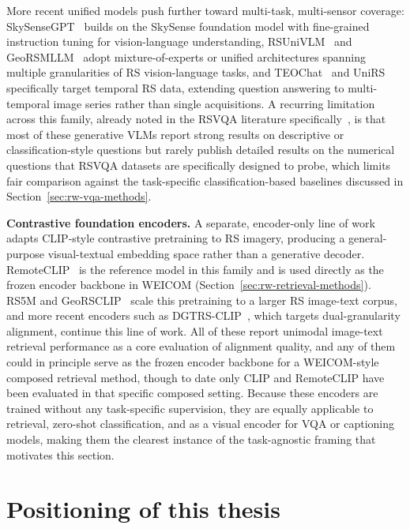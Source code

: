 More recent unified models push further toward multi-task, multi-sensor coverage: SkySenseGPT~\cite{luo2024skysensegptfinegrainedinstructiontuning} builds on the SkySense foundation model with fine-grained instruction tuning for vision-language understanding, RSUniVLM~\cite{liu2024rsunivlmunifiedvisionlanguage} and GeoRSMLLM~\cite{zhang2025georsmllmmultimodallargelanguage} adopt mixture-of-experts or unified architectures spanning multiple granularities of RS vision-language tasks, and TEOChat~\cite{irvin2025teochatlargevisionlanguageassistant} and UniRS~\cite{li2024unirsunifyingmultitemporalremote} specifically target temporal RS data, extending question answering to multi-temporal image series rather than single acquisitions. A recurring limitation across this family, already noted in the RSVQA literature specifically~\cite{boussaidtosato2025tour}, is that most of these generative VLMs report strong results on descriptive or classification-style questions but rarely publish detailed results on the numerical questions that RSVQA datasets are specifically designed to probe, which limits fair comparison against the task-specific classification-based baselines discussed in Section~\ref{sec:rw-vqa-methods}.

\textbf{Contrastive foundation encoders.} A separate, encoder-only line of work adapts CLIP-style contrastive pretraining to RS imagery, producing a general-purpose visual-textual embedding space rather than a generative decoder. RemoteCLIP~\cite{liu2024remoteclip} is the reference model in this family and is used directly as the frozen encoder backbone in WEICOM (Section~\ref{sec:rw-retrieval-methods}). RS5M and GeoRSCLIP~\cite{zhang2024rs5m} scale this pretraining to a larger RS image-text corpus, and more recent encoders such as DGTRS-CLIP~\cite{chen2025dgtrsddgtrsclipdualgranularity}, which targets dual-granularity alignment, continue this line of work. All of these report unimodal image-text retrieval performance as a core evaluation of alignment quality, and any of them could in principle serve as the frozen encoder backbone for a WEICOM-style composed retrieval method, though to date only CLIP and RemoteCLIP have been evaluated in that specific composed setting. Because these encoders are trained without any task-specific supervision, they are equally applicable to retrieval, zero-shot classification, and as a visual encoder for VQA or captioning models, making them the clearest instance of the task-agnostic framing that motivates this section.

\section{Positioning of this thesis}
\label{sec:rw-positioning}
 
